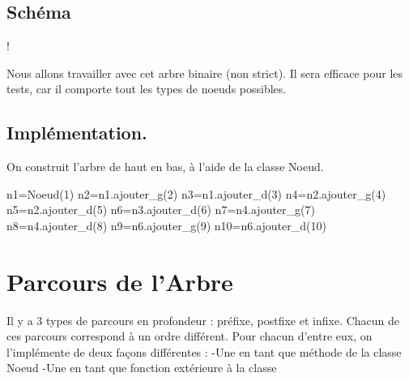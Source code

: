 \documentclass{article}
\begin{document}
\subsection{Schéma}
\begin{center}
\resizebox {\textwidth} {!} {

 }
\end{center}
Nous allons travailler avec cet arbre binaire (non strict). Il sera efficace pour les tests, car il 
comporte tout les types de noeuds possibles.
\subsection{Implémentation.}
On construit l'arbre de haut en bas, à l'aide de la classe Noeud.
\begin{python}
    n1=Noeud(1)
    n2=n1.ajouter_g(2)
    n3=n1.ajouter_d(3)
    n4=n2.ajouter_g(4)
    n5=n2.ajouter_d(5)
    n6=n3.ajouter_d(6)
    n7=n4.ajouter_g(7)
    n8=n4.ajouter_d(8)
    n9=n6.ajouter_g(9)
    n10=n6.ajouter_d(10)
\end{python}

\newpage
\section{Parcours de l'Arbre}
 Il y a 3 types de parcours en profondeur : préfixe, postfixe et infixe.
 Chacun de ces parcours correspond à un ordre différent.
 Pour chacun d'entre eux, on l'implémente de deux façons différentes :
 \newline
 -Une en tant que méthode de la classe Noeud
 \newline
 -Une en tant que fonction extérieure à la classe
\end{document}
